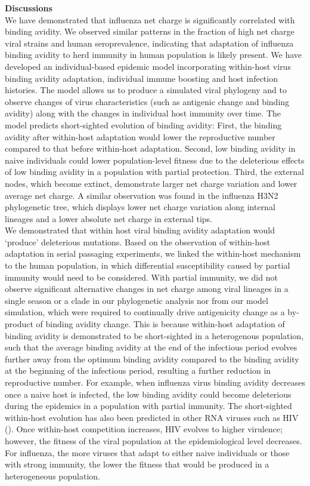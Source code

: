 \documentclass[12pt,a4paper]{article}
\begin{document}
{\bf Discussions}
\textit{} \\
We have demonstrated that influenza net charge is significantly correlated with binding avidity. We observed similar patterns in the fraction of high net charge viral strains and human seroprevalence, indicating that adaptation of influenza binding avidity to herd immunity in human population is likely present. We have developed an individual-based epidemic model incorporating within-host virus binding avidity adaptation, individual immune boosting and host infection histories. The model allows us to produce a simulated viral phylogeny and to observe changes of virus characteristics (such as antigenic change and binding avidity) along with the changes in individual host immunity over time. The model predicts short-sighted evolution of binding avidity: First, the binding avidity after within-host adaptation would lower the reproductive number compared to that before within-host adaptation. Second, low binding avidity in naive individuals could lower population-level fitness due to the deleterious effects of low binding avidity in a population with partial protection. Third, the external nodes, which become extinct, demonstrate larger net charge variation and lower average net charge. A similar observation was found in the influenza H3N2 phylogenetic tree, which displays lower net charge variation along internal lineages and a lower absolute net charge in external tips. \\
We demonstrated that within host viral binding avidity adaptation would ‘produce’ deleterious mutations. Based on the observation of within-host adaptation in serial passaging experiments,  we linked the within-host mechanism to the human population, in which differential susceptibility caused by partial immunity would need to be considered. With partial immunity, we did not observe significant alternative changes in net charge among viral lineages in a single season or a clade in our phylogenetic analysis nor from our model simulation, which were required to continually drive antigenicity change as a by-product of binding avidity change. This is because within-host adaptation of binding avidity is demonstrated to be short-sighted in a heterogenous population, such that the average binding avidity at the end of the infectious period evolves further away from the optimum binding avidity compared to the binding avidity at the beginning of the infectious period, resulting a further reduction in reproductive number. For example, when influenza virus binding avidity decreases once a naive host is infected, the low binding avidity could become deleterious during the epidemics in a population with partial immunity. The short-sighted within-host evolution has also been predicted in other RNA viruses such as HIV (\cite{Lythgoe2013}). Once within-host competition increases, HIV evolves to higher virulence; however, the fitness of the viral population at the epidemiological level decreases. For influenza, the more viruses that adapt to either naive individuals or those with strong immunity, the lower the fitness that would be produced in a  heterogeneous population. \\
\end{document}
